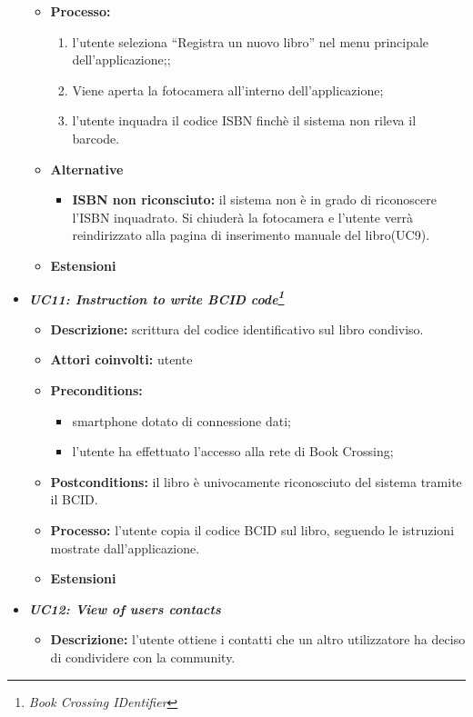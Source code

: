 \begin{itemize}
\begin{itemize}
		\item \textbf{Processo:}
		\begin{enumerate}
			\item l’utente seleziona “Registra un nuovo libro” nel menu principale dell’applicazione;;
			\item Viene aperta la fotocamera all'interno dell'applicazione;
			\item l'utente inquadra il codice ISBN finchè il sistema non rileva il barcode.
		\end{enumerate}
		\item \textbf{Alternative}
		\begin{itemize}
			\item \textbf{ISBN non riconsciuto:} il sistema non è in grado di riconoscere l'ISBN inquadrato. Si chiuderà la fotocamera e l'utente verrà reindirizzato alla pagina di inserimento manuale del libro(UC9).
		\end{itemize}
		\item \textbf{Estensioni}
	\end{itemize}
	\item \textbf{\textit{UC11: Instruction to write BCID code\footnote{\textit{Book Crossing IDentifier}}}}
	\begin{itemize}
		\item \textbf{Descrizione:} scrittura del codice identificativo sul libro condiviso.
		\item \textbf{Attori coinvolti:} utente
		\item \textbf{Preconditions:}
		\begin{itemize}
			\item smartphone dotato di connessione dati;
			\item l’utente ha effettuato l’accesso alla rete di Book Crossing;
		\end{itemize}
		\item \textbf{Postconditions:} il libro è univocamente riconosciuto del sistema tramite il BCID.
		\item \textbf{Processo:} l'utente copia il codice BCID sul libro, seguendo le istruzioni mostrate dall'applicazione.
		\item \textbf{Estensioni}
	\end{itemize}
	\item \textbf{\textit{UC12: View of users contacts}}
	\begin{itemize}
		\item \textbf{Descrizione:} l'utente ottiene i contatti che un altro utilizzatore ha deciso di condividere con la community.

\end{itemize}
\end{itemize}
